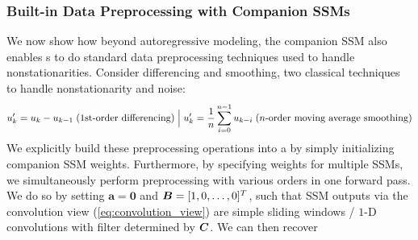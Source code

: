 \subsubsection{Built-in Data Preprocessing with Companion SSMs}
\label{sec:preprocessing_ssms}

We now show how beyond autoregressive modeling, the companion SSM also enables \ourmethodunit{}s to do
standard data preprocessing techniques used to handle nonstationarities. 
%
% 
Consider differencing and smoothing, two classical techniques to handle nonstationarity and noise:
\[
u_k' = u_{k} - u_{k - 1}\; \text{(1st-order differencing)} \;\Big{\lvert{}}\;
u_k' = \frac{1}{n} \sum_{i = 0}^{n - 1} u_{k - i} \; \text{($n$-order moving average smoothing)}
\]
%
%
%
We explicitly build these preprocessing operations into a \ourmethodunit{} by simply initializing companion SSM weights. Furthermore, by specifying weights for multiple SSMs, we simultaneously perform preprocessing with various orders in one forward pass. 
%
We do so by setting $\boldsymbol{a} = \boldsymbol{0}$ and $\boldsymbol{B} = [1, 0, \ldots, 0]^T$, such that SSM outputs via the convolution view (\ref{eq:convolution_view}) are simple sliding windows / $1$-D convolutions with filter determined by $\boldsymbol{C}$. We can then recover
